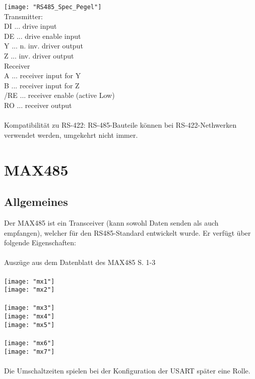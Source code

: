 \documentclass[11pt]{report}
\begin{document}
		\texttt{[image: "RS485\_Spec\_Pegel"]}\\
		Transmitter:\\
		DI ... drive input\\
		DE ... drive enable input\\
		Y ... n. inv. driver output\\
		Z ... inv. driver output\\
		Receiver\\
		A ... receiver input for Y\\
		B ... receiver input for Z\\
		/RE ... receiver enable (active Low)\\
		RO ... receiver output\\
		\\Kompatibilität zu RS-422: RS-485-Bauteile können bei RS-422-Nethwerken verwendet werden, umgekehrt nicht immer.
	\section{MAX485}
		\subsection{Allgemeines}
		Der MAX485 ist ein Transceiver (kann sowohl Daten senden als auch empfangen), welcher für den RS485-Standard entwickelt wurde. Er verfügt über folgende Eigenschaften:\\
		\\Auszüge aus dem Datenblatt des MAX485 S. 1-3\\
		\\\texttt{[image: "mx1"]}\\
		\texttt{[image: "mx2"]}\\ 
		\\\texttt{[image: "mx3"]}\\
		\texttt{[image: "mx4"]}\\
		\texttt{[image: "mx5"]}\\
		\\\texttt{[image: "mx6"]}\\
		\texttt{[image: "mx7"]}\\
		\\Die Umschaltzeiten spielen bei der Konfiguration der USART später eine Rolle.
\end{document}
